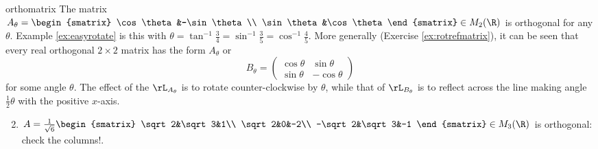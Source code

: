 \begin{examples}{}{orthomatrix}
\exstart The matrix $A_\theta=\begin{smatrix}
	\cos\theta&-\sin\theta\\
	\sin\theta&\cos\theta
  \end{smatrix}\in M_2(\R)$ is orthogonal for any $\theta$. Example \ref{ex:easyrotate} is this with $\theta=\tan^{-1}\frac 34=\sin^{-1}\frac 35=\cos^{-1}\frac 45$. More generally (Exercise \ref{ex:rotrefmatrix}), it can be seen that every real orthogonal $2\times 2$ matrix has the form $A_\theta$ or \[B_\theta=\begin{pmatrix}
	\cos\theta&\sin\theta\\
	\sin\theta&-\cos\theta
	\end{pmatrix}\]
	for some angle $\theta$. The effect of the $\rL_{A_\theta}$ is to rotate counter-clockwise by $\theta$, while that of $\rL_{B_\theta}$ is to reflect across the line making angle $\frac 12\theta$ with the positive $x$-axis.

\begin{enumerate}\setcounter{enumi}{1}
	\item $A=\frac 1{\sqrt 6}\begin{smatrix}
	\sqrt 2&\sqrt 3&1\\
	\sqrt 2&0&-2\\
	-\sqrt 2&\sqrt 3&-1
	\end{smatrix}\in M_3(\R)$ is orthogonal: check the columns!.
	

\end{enumerate}
\end{examples}
